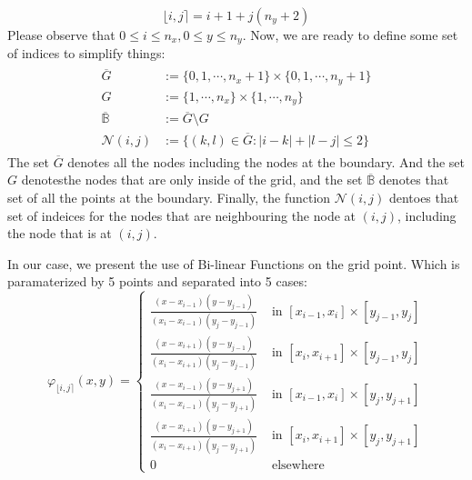 \documentclass[]{article}
\begin{document}
    $$
        \lfloor i, j\rceil = i + 1 + j(n_y + 2)
    $$
    Please observe that $0\le i \le n_x, 0 \le y\le n_y $. Now, we are ready to define some set of indices to simplify things: 
    \begin{align*}\tag{3.3}\label{eqn:3.3}
        \begin{aligned}
                \overline{G} &:= \{0, 1, \cdots, n_x + 1\}\times \{0, 1, \cdots, n_y + 1\}
                \\
                G &:= \{1, \cdots, n_x\}\times \{1, \cdots, n_y\}
                \\
                \mathbb{\overline{B}}&:= \overline{G}\setminus G
                \\
                \mathcal{N}(i, j) &:= \{(k, l)\in \overline{G}: |i - k| + |l - j| \le 2\}
            \end{aligned}
    \end{align*}
    The set $\overline{G}$ denotes all the nodes including the nodes at the boundary. And the set $G$ denotesthe nodes that are only inside of the grid, and the set $\overline{\mathbb{B}}$ denotes that set of all the points at the boundary. Finally, the function $\mathcal{N}(i, j)$ dentoes that set of indeices for the nodes that are neighbouring the node at $(i, j)$, including the node that is at $(i, j)$. 
    \par
    In our case, we present the use of Bi-linear Functions on the grid point. Which is paramaterized by 5 points and separated into 5 cases: 
    \begin{equation*}\tag{3.4}\label{eqn:3.4}
        \varphi_{\lfloor i, j \rceil}(x, y)
        = \begin{cases}
            \frac{\left(x-x_{i-1}\right)\left(y-y_{j-1}\right)}{\left(x_{i}-x_{i-1}\right)\left(y_{j}-y_{j-1}\right)} & \text { in }\left[x_{i-1}, x_{i}\right] \times\left[y_{j-1}, y_{j}\right] 
            \\[0.5em]
            \frac{\left(x-x_{i+1}\right)\left(y-y_{j-1}\right)}{\left(x_{i}-x_{i+1}\right)\left(y_{j}-y_{j-1}\right)} & \text { in }\left[x_{i}, x_{i+1}\right] \times\left[y_{j-1}, y_{j}\right] 
            \\[0.5em]
            \frac{\left(x-x_{i-1}\right)\left(y-y_{j+1}\right)}{\left(x_{i}-x_{i-1}\right)\left(y_{j}-y_{j+1}\right)} & \text { in }\left[x_{i-1}, x_{i}\right] \times\left[y_{j}, y_{j+1}\right] 
            \\[0.5em]
            \frac{\left(x-x_{i+1}\right)\left(y-y_{j+1}\right)}{\left(x_{i}-x_{i+1}\right)\left(y_{j}-y_{j+1}\right)} & \text { in }\left[x_{i}, x_{i+1}\right] \times\left[y_{j}, y_{j+1}\right] 
            \\[0.5em]
            0 & \text { elsewhere }
        \end{cases}
    \end{equation*}
\end{document}
